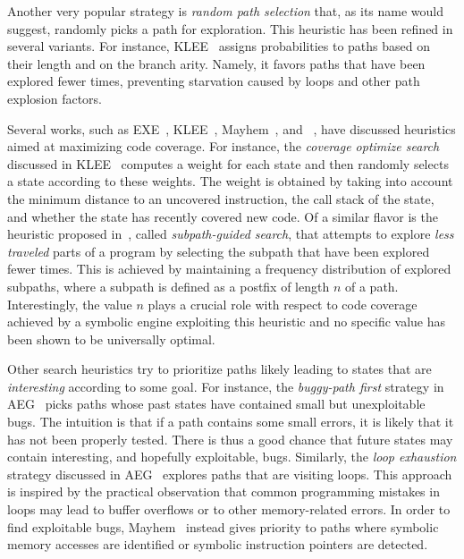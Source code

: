 Another very popular strategy is {\em random path selection} that, as its name would suggest, randomly picks a path for exploration. This heuristic has been refined in several variants. For instance, {\sc KLEE}~\cite{KLEE-OSDI08} assigns probabilities to paths based on their length and on the branch arity. Namely, it favors paths that have been explored fewer times, preventing starvation caused by loops and other path explosion factors.

Several works, such as {\sc EXE}~\cite{EXE-CCS06}, {\sc KLEE}~\cite{KLEE-OSDI08}, {\sc Mayhem}~\cite{MAYHEM-SP12}, and {\sc \stwoe}~\cite{CKC-TOCS12}, have discussed heuristics aimed at maximizing code coverage. For instance, the {\em coverage optimize search} discussed in {\sc KLEE}~\cite{KLEE-OSDI08} computes a weight for each state and then randomly selects a state according to these weights. The weight is obtained by taking into account the minimum distance to an uncovered instruction, the call stack of the state, and whether the state has recently covered new code. Of a similar flavor is the heuristic proposed in~\cite{LZL-OOPSLA13}, called {\em subpath-guided search}, that attempts to explore {\it less traveled} parts of a program by selecting the subpath that have been explored fewer times. This is achieved by maintaining a frequency distribution of explored subpaths, where a subpath is defined as a postfix of length $n$ of a path. Interestingly, the value $n$ plays a crucial role with respect to code coverage achieved by a symbolic engine exploiting this heuristic and no specific value has been shown to be universally optimal.

Other search heuristics try to prioritize paths likely leading to states that are {\em interesting} according to some goal. For instance, the {\em buggy-path first} strategy in {\sc AEG}~\cite{AEG-NDSS11} picks paths whose past states have contained small but unexploitable bugs. The intuition is that if a path contains some small errors, it is likely that it has not been properly tested. There is thus a good chance that future states may contain interesting, and hopefully exploitable, bugs. Similarly, the {\em loop exhaustion} strategy discussed in {\sc AEG}~\cite{AEG-NDSS11} explores paths that are visiting loops. This approach is inspired by the practical observation that common programming mistakes in loops may lead to buffer overflows or to other memory-related errors. In order to find exploitable bugs, {\sc Mayhem}~\cite{MAYHEM-SP12} instead gives priority to paths where symbolic memory accesses are identified or symbolic instruction pointers are detected. 

